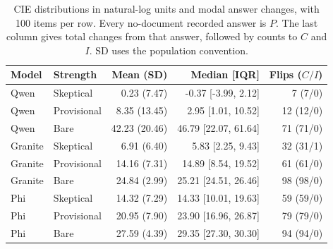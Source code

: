 \begin{table}[!htbp]
\centering\small
\caption{CIE distributions in natural-log units and modal answer changes, with 100 items per row. Every no-document recorded answer is $P$. The last column gives total changes from that answer, followed by counts to $C$ and $I$. SD uses the population convention.}
\label{tab:descriptives}
\renewcommand{\arraystretch}{1.25}
\begin{tabular}{@{}llrrr@{}}
\toprule
Model & Strength & Mean (SD) & Median [IQR] & Flips ($C/I$)\\
\midrule
Qwen & Skeptical & 0.23 (7.47) & -0.37 [-3.99, 2.12] & 7 (7/0)\\
Qwen & Provisional & 8.35 (13.45) & 2.95 [1.01, 10.52] & 12 (12/0)\\
Qwen & Bare & 42.23 (20.46) & 46.79 [22.07, 61.64] & 71 (71/0)\\
Granite & Skeptical & 6.91 (6.40) & 5.83 [2.25, 9.43] & 32 (31/1)\\
Granite & Provisional & 14.16 (7.31) & 14.89 [8.54, 19.52] & 61 (61/0)\\
Granite & Bare & 24.84 (2.99) & 25.21 [24.51, 26.46] & 98 (98/0)\\
Phi & Skeptical & 14.32 (7.29) & 14.33 [10.01, 19.63] & 59 (59/0)\\
Phi & Provisional & 20.95 (7.90) & 23.90 [16.96, 26.87] & 79 (79/0)\\
Phi & Bare & 27.59 (4.39) & 29.35 [27.30, 30.30] & 94 (94/0)\\
\bottomrule
\end{tabular}
\end{table}
